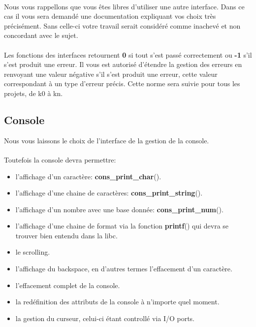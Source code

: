 \documentclass[10pt,a4wide]{article}
\begin{document}
\paragraph{}

Nous vous rappellons que vous \^etes libres d'utiliser une autre
interface. Dans ce cas il vous sera demand\'e une documentation expliquant
vos choix tr\`es pr\'ecis\'ement. Sans celle-ci votre travail serait
consid\'er\'e comme inachev\'e et non concordant avec le sujet.

\paragraph{}

Les fonctions des interfaces retournent \textbf{0} si tout s'est
pass\'e correctement ou \textbf{-1} s'il s'est produit une erreur.
Il vous est autoris\'e d'\'etendre la gestion des erreurs en
renvoyant une valeur n\'egative s'il s'est produit une erreur,
cette valeur correspondant \`a un type d'erreur pr\'ecis. Cette norme
sera suivie pour tous les projets, de k0 \`a kn.

\subsection{Console}

Nous vous laissons le choix de l'interface de la gestion de la console.

\paragraph{}

Toutefois la console devra permettre:

\begin{itemize}
\item l'affichage d'un caract\`ere: \textbf{cons\_print\_char}().
\item l'affichage d'une chaine de caract\`eres: \textbf{cons\_print\_string}().
\item l'affichage d'un nombre avec une base donn\'ee:
      \textbf{cons\_print\_num}().
\item l'affichage d'une chaine de format via la fonction \textbf{printf}() qui
      devra se trouver bien entendu dans la libc.
\item le scrolling.
\item l'affichage du backspace, en d'autres termes l'effacement
      d'un caract\`ere.
\item l'effacement complet de la console.
\item la red\'efinition des attributs de la console \`a n'importe quel moment.
\item la gestion du curseur, celui-ci \'etant controll\'e via I/O ports.
\end{itemize}
\end{document}
